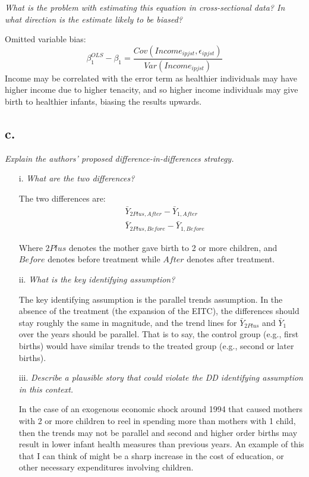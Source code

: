 \documentclass[
]{article}
\begin{document}
\textit{What is the problem with estimating this equation in cross-sectional data? In what direction is the estimate likely to be biased?}

Omitted variable bias:
\[\beta_1 ^{OLS} - \beta_1 = \frac{Cov(Income_{ipjst} , \epsilon_{ipjst})}{Var(Income_{ipjst})}\]
Income may be correlated with the error term as healthier individuals
may have higher income due to higher tenacity, and so higher income
individuals may give birth to healthier infants, biasing the results
upwards.

\hypertarget{c.-3}{%
\subsection{c.~}\label{c.-3}}

\textit{Explain the authors’ proposed difference-in-differences strategy.}\\

\begin{enumerate}
\item[i.] \textit{What are the two differences?}  
  
The two differences are: 
\[\begin{aligned}
&\bar{Y}_{2Plus, After} - \bar{Y}_{1, After} \\
&\bar{Y}_{2Plus, Before} - \bar{Y}_{1, Before}
\end{aligned}\]

Where $2Plus$ denotes the mother gave birth to 2 or more children, and $Before$ denotes before treatment while $After$ denotes after treatment. 
  
\item[ii.] \textit{What is the key identifying assumption?}  
  
The key identifying assumption is the parallel trends assumption. In the absence of the treatment (the expansion of the EITC), the differences should stay roughly the same in magnitude, and the trend lines for $\bar{Y}_{2Plus}$ and $\bar{Y}_{1}$ over the years should be parallel. That is to say, the control group (e.g., first births) would have similar trends to the treated group (e.g., second or later births). 


\item[iii.] \textit{Describe a plausible story that could violate the DD identifying assumption in this context.}  
  
In the case of an exogenous economic shock around 1994 that caused mothers with 2 or more children to reel in spending more than mothers with 1 child, then the trends may not be parallel and second and higher order births may result in lower infant health measures than previous years. An example of this that I can think of might be a sharp increase in the cost of education, or other necessary expenditures involving children. 
\end{enumerate}
\end{document}
